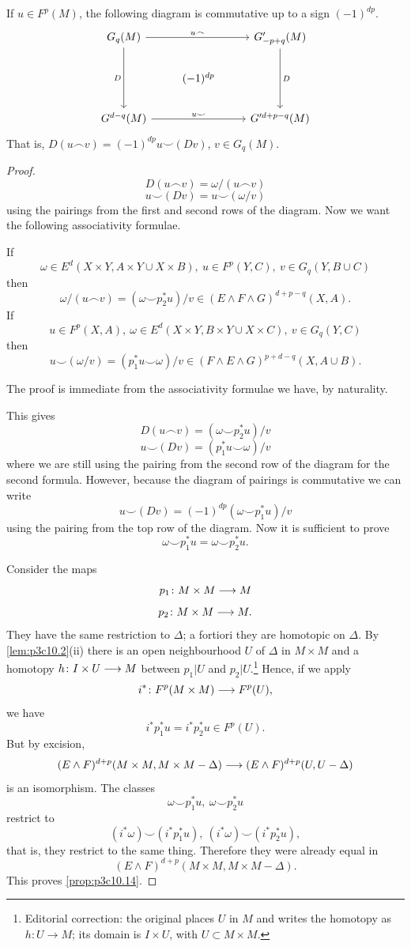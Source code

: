 \documentclass[../main]{subfiles}
\begin{document}
\begin{proposition}\label{prop:p3c10.14}
If $u \in F^p(M)$, the following diagram is commutative up to a sign $(-1)^{dp}$.
\[
\begin{tikzcd}
G_q(M) \arrow[rr, "u \frown"] \arrow[dd, "D"'] &           & G'_{-p + q}(M) \arrow[dd, "D"] \\
                                               & (-1)^{dp} &                                \\
G^{d - q}(M) \arrow[rr, "u \smile"]            &           & G'^{d + p - q}(M)             
\end{tikzcd}
\] 
That is, $D(u \frown v) = (-1)^{dp} u \smile (Dv)$, $v \in G_q(M)$.
\end{proposition}
\begin{proof}
\[D(u \frown v) = \omega / (u \frown v)\] 
\[u \smile (Dv) = u \smile (\omega / v)\]
using the pairings from the first and second rows of the diagram.
Now we want the following associativity formulae.
\begin{lemma}\label{lem:p3c10.15}
If
\[\omega \in E^d(X \times Y, A \times Y \cup X \times B), \ u \in F^p(Y,C), \ v \in G_q(Y,B \cup C)\]
then 
\[\omega / (u \frown v) = (\omega \smile p_2^*u)/v \in (E \wedge F \wedge G)^{d+p-q}(X,A).\]
If \[u \in F^p(X,A), \ \omega \in E^d(X \times Y, B \times Y \cup X \times C), \ v \in G_q(Y,C)\]
then
\[u \smile (\omega / v) = (p_1^* u \smile \omega)/v \in (F \wedge E \wedge G)^{p+d-q}(X,A \cup B).\]
\end{lemma}
The proof is immediate from the associativity formulae we have, by naturality.

This gives
\[D(u \frown v) = (\omega \smile p_2^* u)/v\]
\[u \smile (Dv) = (p_1^* u \smile \omega)/v\]
where we are still using the pairing from the second row of the diagram for the second formula. However, because the diagram of pairings is commutative we can write 
\[u \smile (Dv) = (-1)^{dp}(\omega \smile p_1^* u)/v\]
using the pairing from the top row of the diagram. Now it is sufficient to prove
\[\omega \smile p_1^* u = \omega \smile p_2^*u.\]

Consider the maps
\[p_1 \colon M \times M \longrightarrow M\]
\[p_2 \colon M \times M \longrightarrow M.\]
They have the same restriction to $\Delta$; a fortiori they are homotopic on $\Delta$. By \ref{lem:p3c10.2}(ii) there is an open neighbourhood $U$ of $\Delta$ in $M\times M$ and a homotopy $h \colon I\times U \longrightarrow M$ between $p_1|U$ and $p_2|U$.\footnote{Editorial correction: the original places $U$ in $M$ and writes the homotopy as $h:U\to M$; its domain is $I\times U$, with $U\subset M\times M$.} Hence, if we apply
\[i^*\colon F^p(M \times M) \longrightarrow F^p(U),\]
we have
\[i^* p^*_1 u = i^* p^*_2 u \in F^p(U).\]
But by excision,
\[(E \wedge F)^{d+p}(M \times M, M \times M - \Delta) \longrightarrow (E \wedge F)^{d+p}(U,U-\Delta)\]
is an isomorphism. The classes 
\[\omega \smile p_1^*u, \ \omega \smile p_2^*u\]
restrict to 
\[(i^*\omega) \smile (i^*p_1^*u), \ (i^*\omega) \smile (i^* p_2^*u),\]
that is, they restrict to the same thing. Therefore they were already equal in
\[(E \wedge F)^{d+p}(M \times M, M \times M - \Delta).\]
This proves \ref{prop:p3c10.14}.
\end{proof}
\end{document}
